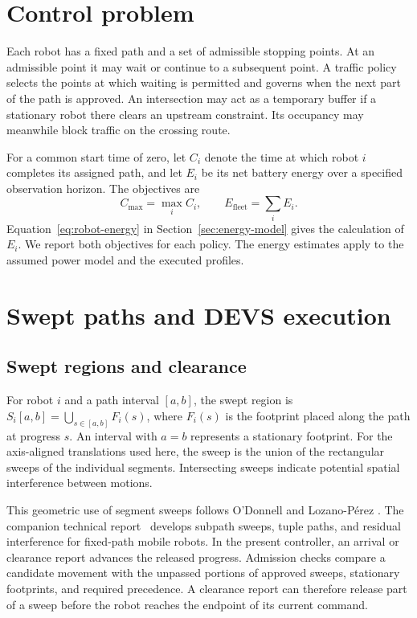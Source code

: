 \documentclass[11pt,a4paper]{article}
\begin{document}
\section{Control problem}
Each robot has a fixed path and a set of admissible stopping points. At an
admissible point it may wait or continue to a subsequent point. A traffic
policy selects the points at which waiting is permitted and governs when
the next part of the path is approved. An intersection may act as a
temporary buffer if a stationary robot there clears an upstream constraint.
Its occupancy may meanwhile block traffic on the crossing route.

For a common start time of zero, let $C_i$ denote the time at which robot $i$
completes its assigned path, and let $E_i$ be its net battery energy over a
specified observation horizon. The objectives are
\[
 C_{\max}=\max_i C_i,\qquad E_{\mathrm{fleet}}=\sum_i E_i.
\]
Equation~\eqref{eq:robot-energy} in Section~\ref{sec:energy-model} gives the calculation of $E_i$.
We report both objectives for each policy. The energy estimates apply to the
assumed power model and the executed profiles.

\section{Swept paths and DEVS execution}
\subsection{Swept regions and clearance}
For robot $i$ and a path interval $[a,b]$, the swept region is
$S_i[a,b]=\bigcup_{s\in[a,b]} F_i(s)$, where $F_i(s)$ is the footprint
placed along the path at progress $s$. An interval with $a=b$
represents a stationary footprint. For the axis-aligned translations
used here, the sweep is the union of the rectangular sweeps of the
individual segments. Intersecting sweeps indicate potential spatial
interference between motions.

This geometric use of segment sweeps follows O'Donnell and Lozano-P\'erez
\cite{odonnell1989}. The companion technical report~\cite{hwang2026sweep}
develops subpath sweeps, tuple paths, and residual interference for
fixed-path mobile robots. In the present controller, an arrival or
clearance report advances the released progress. Admission checks
compare a candidate movement with the unpassed portions of approved
sweeps, stationary footprints, and required precedence. A clearance
report can therefore release part of a sweep before the robot reaches
the endpoint of its current command.
\end{document}
